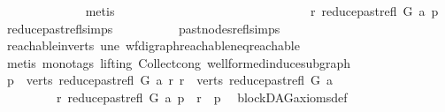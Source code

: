 \begin{isabellebody}
\ \ \ \ \ \ \ \ \ \ \ \ \isamarkupfalse%
\ metis\ \isanewline
\ \ \ \ \ \ \ \ \isamarkupfalse%
\ \isanewline
\ \ \ \ \ \ \isamarkupfalse%
\ \ \ \isanewline
\ \ \ \ \ \ \isamarkupfalse%
\ \isamarkupfalse%
\ {\isachardoublequoteopen}r\ {\isasymrightarrow}\isactrlsup {\isacharplus}{\kern0pt}\isactrlbsub reduce{\isacharunderscore}{\kern0pt}past{\isacharunderscore}{\kern0pt}refl\ G\ a\isactrlesub \ p{\isachardoublequoteclose}\ \isamarkupfalse%
\ reduce{\isacharunderscore}{\kern0pt}past{\isacharunderscore}{\kern0pt}refl{\isachardot}{\kern0pt}simps\isanewline
\ \ \ \ \ \ \ \ \ \ past{\isacharunderscore}{\kern0pt}nodes{\isacharunderscore}{\kern0pt}refl{\isachardot}{\kern0pt}simps\ \isamarkupfalse%
\ reachable{\isacharunderscore}{\kern0pt}in{\isacharunderscore}{\kern0pt}verts\ une\ wf{\isacharunderscore}{\kern0pt}digraph{\isachardot}{\kern0pt}reachable{\isacharunderscore}{\kern0pt}neq{\isacharunderscore}{\kern0pt}reachable{}\isanewline
\ \ \ \ \ \ \ \ \isamarkupfalse%
\ {\isacharparenleft}{\kern0pt}metis\ {\isacharparenleft}{\kern0pt}mono{\isacharunderscore}{\kern0pt}tags{\isacharcomma}{\kern0pt}\ lifting{\isacharparenright}{\kern0pt}\ Collect{\isacharunderscore}{\kern0pt}cong\ wellformed{\isacharunderscore}{\kern0pt}induce{\isacharunderscore}{\kern0pt}subgraph{\isacharparenright}{\kern0pt}\isanewline
\ \ \ \ \isamarkupfalse%
\isanewline
\ \ \ \ \isamarkupfalse%
\ \isamarkupfalse%
\ {\isachardoublequoteopen}{\isasymexists}p\ {\isasymin}\ verts\ {\isacharparenleft}{\kern0pt}reduce{\isacharunderscore}{\kern0pt}past{\isacharunderscore}{\kern0pt}refl\ G\ a{\isacharparenright}{\kern0pt}{\isachardot}{\kern0pt}\ {\isacharparenleft}{\kern0pt}{\isasymforall}r{\isachardot}{\kern0pt}\ r\ {\isasymin}\ verts\ {\isacharparenleft}{\kern0pt}reduce{\isacharunderscore}{\kern0pt}past{\isacharunderscore}{\kern0pt}refl\ G\ a{\isacharparenright}{\kern0pt}\ \isanewline
\ \ \ \ \ \ \ \ {\isasymlongrightarrow}\ {\isacharparenleft}{\kern0pt}r\ {\isasymrightarrow}\isactrlsup {\isacharplus}{\kern0pt}\isactrlbsub reduce{\isacharunderscore}{\kern0pt}past{\isacharunderscore}{\kern0pt}refl\ G\ a\isactrlesub \ p\ {\isasymor}\ r\ {\isacharequal}{\kern0pt}\ p{\isacharparenright}{\kern0pt}{\isacharparenright}{\kern0pt}{\isachardoublequoteclose}\ \isamarkupfalse%
\ blockDAG{\isacharunderscore}{\kern0pt}axioms{\isacharunderscore}{\kern0pt}def\ \isanewline
\ \ \ \ \ \ \isamarkupfalse%

\end{isabellebody}
